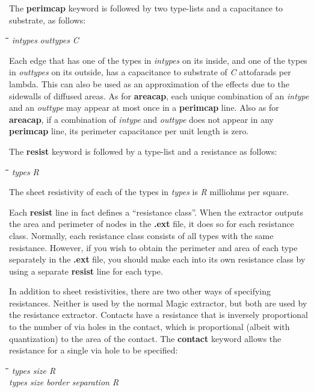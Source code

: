 \documentclass[letterpaper,twoside,12pt]{article}
\def\hinch{\hspace*{0.5in}}
\def\starti{\begin{center}\begin{tabbing}\hinch\=\hinch\=\hinch\=\hinch\=\kill}
\def\endi{\end{tabbing}\end{center}}
\def\ii{\>\>\>}
\begin{document}
The {\bfseries perimcap} keyword is followed by two type-lists
and a capacitance to substrate, as follows:

\starti
   \ii {\bfseries perimcap} {\itshape intypes} {\itshape outtypes} {\itshape C}
\endi

Each edge that has one of the types in {\itshape intypes}
on its inside, and one of the types in {\itshape outtypes} on its outside,
has a capacitance to substrate of {\itshape C} attofarads per lambda.
This can also be used as an approximation of the effects due
to the sidewalls of diffused areas.
As for {\bfseries areacap}, each unique combination of an {\itshape intype}
and an {\itshape outtype} may appear at most once in a {\bfseries perimcap} line.
Also as for {\bfseries areacap}, if a combination of {\itshape intype} and
{\itshape outtype} does not appear in any {\bfseries perimcap} line, its
perimeter capacitance per unit length is zero.

The {\bfseries resist} keyword is followed by a type-list
and a resistance as follows:

\starti
   \ii {\bfseries resist} {\itshape types} {\itshape R}
\endi

The sheet resistivity of each of the types in {\itshape types} is
{\itshape R} milliohms per square.

Each {\bfseries resist} line in fact defines a ``resistance class''.
When the extractor outputs the area and perimeter of nodes in
the {\bfseries .ext} file, it does so for each resistance class.
Normally, each resistance class consists of all types with
the same resistance.
However, if you wish to obtain the perimeter and area of each
type separately in the {\bfseries .ext} file, you should make each
into its own resistance class by using a separate {\bfseries resist}
line for each type.

In addition to sheet resistivities, there are two other ways
of specifying resistances.  Neither is used by the normal
Magic extractor, but both are used by the resistance extractor.
Contacts have a resistance that is inversely proportional to
the number of via holes in the contact, which is proportional
(albeit with quantization) to the area of the contact.  The
{\bfseries contact} keyword allows the resistance for a single
via hole to be specified:

\starti
   \ii {\bfseries contact} {\itshape types size R} \\
   \ii {\bfseries contact} {\itshape types size border separation R}
\endi
\end{document}
